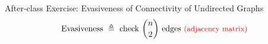 \begin{frame}{}
  \begin{exampleblock}{After-class Exercise: Evasiveness of Connectivity of Undirected Graphs}
    \[
      \text{Evasiveness } \triangleq \text{ check } \binom{n}{2} \text{ edges \textcolor{red}{\small (adjacency matrix)}}
    \]

    \centerline{}
  \end{exampleblock}

  \pause
  \vspace{0.20cm}
\end{frame}

